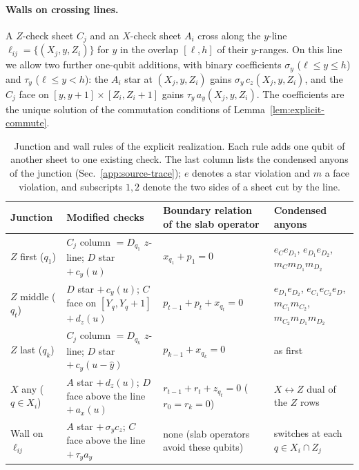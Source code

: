 \documentclass[aps,prx,reprint,superscriptaddress,nofootinbib,floatfix,longbibliography]{revtex4-2}
\theoremstyle{definition}
\begin{document}
\paragraph{Walls on crossing lines.}
A $Z$-check sheet $C_j$ and an $X$-check sheet $A_i$ cross along the $y$-line
$\ell_{ij}=\{(X_j,y,Z_i)\}$ for $y$ in the overlap $[\ell,h]$ of their
$y$-ranges.  On this line we allow two further one-qubit additions, with
binary coefficients $\sigma_y$ ($\ell\le y\le h$) and $\tau_y$
($\ell\le y<h$): the $A_i$ star at $(X_j,y,Z_i)$ gains
$\sigma_y\,c_z(X_j,y,Z_i)$, and the $C_j$ face on
$[y,y+1]\times[Z_i,Z_i+1]$ gains $\tau_y\,a_y(X_j,y,Z_i)$.  The coefficients
are the unique solution of the commutation conditions of
Lemma~\ref{lem:explicit-commute}.

\begin{table}[t]
\caption{Junction and wall rules of the explicit realization.  Each rule adds
one qubit of another sheet to one existing check.  The last column lists the
condensed anyons of the junction (Sec.~\ref{app:source-trace}); $e$
denotes a star violation and $m$ a face violation, and subscripts
$1,2$ denote the two sides of a sheet cut by the line.}
\label{tab:explicit-junctions}
\scriptsize
\setlength{\tabcolsep}{4pt}
\renewcommand{\arraystretch}{1.18}
\begin{tabular}{@{}p{2.3cm}p{5.2cm}p{4.3cm}p{4.3cm}@{}}
\toprule
Junction & Modified checks & Boundary relation of the slab operator & Condensed anyons \\
\midrule
$Z$ first ($q_1$) & $C_j$ column $=D_{q_1}$ $z$-line; $D$ star $+\,c_y(u)$ & $x_{q_1}+p_1=0$ & $e_{C}e_{D_1}$, $e_{D_1}e_{D_2}$, $m_Cm_{D_1}m_{D_2}$ \\
$Z$ middle ($q_t$) & $D$ star $+\,c_y(u)$; $C$ face on $[Y_q,Y_q{+}1]$ $+\,d_z(u)$ & $p_{t-1}+p_t+x_{q_t}=0$ & $e_{D_1}e_{D_2}$, $e_{C_1}e_{C_2}e_D$, $m_{C_1}m_{C_2}$, $m_{C_2}m_{D_1}m_{D_2}$ \\
$Z$ last ($q_k$) & $C_j$ column $=D_{q_k}$ $z$-line; $D$ star $+\,c_y(u-\hat y)$ & $p_{k-1}+x_{q_k}=0$ & as first \\
$X$ any ($q\in X_i$) & $A$ star $+\,d_z(u)$; $D$ face above the line $+\,a_x(u)$ & $r_{t-1}+r_t+z_{q_t}=0$ ($r_0=r_k=0$) & $X\leftrightarrow Z$ dual of the $Z$ rows \\
Wall on $\ell_{ij}$ & $A$ star $+\,\sigma_y c_z$; $C$ face above the line $+\,\tau_y a_y$ & none (slab operators avoid these qubits) & switches at each $q\in X_i\cap Z_j$ \\
\bottomrule
\end{tabular}
\end{table}
\end{document}
